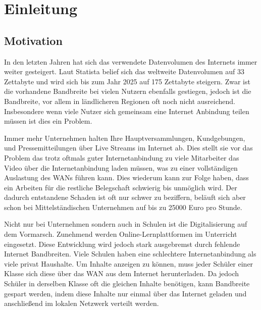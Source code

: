 \chapter{Einleitung}\label{ch:introduction}


%

\section{Motivation}
In den letzten Jahren hat sich das verwendete Datenvolumen des Internets immer weiter gesteigert. Laut Statista belief sich das weltweite Datenvolumen auf 33 Zettabyte und wird sich bis zum Jahr 2025 auf 175 Zettabyte steigern.\cite{statistica-datenvolumen} Zwar ist die vorhandene Bandbreite bei vielen Nutzern ebenfalls gestiegen, jedoch ist die Bandbreite, vor allem in ländlicheren Regionen oft noch nicht ausreichend.\cite{bmvi-bandbreite} Insbesondere wenn viele Nutzer sich gemeinsam eine Internet Anbindung teilen müssen ist dies ein Problem.

Immer mehr Unternehmen halten Ihre Hauptversammlungen, Kundgebungen, und Pressemitteilungen über Live Streams im Internet ab. Dies stellt sie vor das Problem das trotz oftmals guter Internetanbindung zu viele Mitarbeiter das Video über die Internetanbindung laden müssen, was zu einer vollständigen Auslastung des WANs führen kann. Dies wiederum kann zur Folge haben, dass ein Arbeiten für die restliche Belegschaft schwierig bis unmöglich wird. Der dadurch entstandene Schaden ist oft nur schwer zu beziffern, beläuft sich aber schon bei Mittelständischen Unternehmen auf bis zu 25000 Euro pro Stunde.\cite{zero-internet-schaden}

Nicht nur bei Unternehmen sondern auch in Schulen ist die Digitalisierung auf dem Vormarsch. Zunehmend werden Online-Lernplattformen im Unterricht eingesetzt. Diese Entwicklung wird jedoch stark ausgebremst durch fehlende Internet Bandbreiten. Viele Schulen haben eine schlechtere Internetanbindung als viele privat Haushalte.\cite{sonderstudie_digital} Um Inhalte anzeigen zu können, muss jeder Schüler einer Klasse sich diese über das WAN aus dem Internet herunterladen. Da jedoch Schüler in derselben Klasse oft die gleichen Inhalte benötigen, kann Bandbreite gespart werden, indem diese Inhalte nur einmal über das Internet geladen und anschließend im lokalen Netzwerk verteilt werden.

